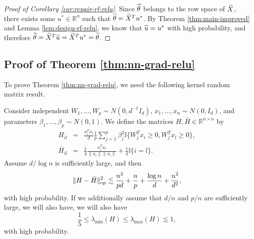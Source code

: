 \begin{proof}[Proof of Corollary \ref{cor:repair-rf-relu}]
Since $\widehat{\theta}$ belongs to the row space of $\widetilde{X}$, there exists some $u^*\in\mathbb{R}^n$ such that $\widehat{\theta}=\widetilde{X}^Tu^*$.
By Theorem \ref{thm:main-improved} and Lemma \ref{lem:design-rf-relu}, we know that $\widetilde{u}=u^*$ with high probability, and therefore $\widetilde{\theta}=\widetilde{X}^T\widetilde{u}=\widetilde{X}^Tu^*=\widehat{\theta}$.
\end{proof}



\subsection{Proof of Theorem \ref{thm:nn-grad-relu}}

To prove Theorem \ref{thm:nn-grad-relu}, we need the following kernel random matrix result.
\begin{lemma}\label{lem:lim-H-relu}
Consider independent $W_1,\ldots,W_p\sim N(0,d^{-1}I_d)$, $x_1,\ldots,x_n\sim N(0,I_d)$, and parameters $\beta_1,\ldots,\beta_p\sim N(0,1)$. We define the matrices $H, \bar{H}\in\mathbb{R}^{n\times n}$ by
\begin{eqnarray*}
H_{il} &=& \frac{x_i^Tx_l}{d}\frac{1}{p}\sum_{j=1}^p\beta_j^2\mathbb{I}\{W_j^Tx_i\geq 0, W_j^Tx_l\geq 0\}, \\
\bar{H}_{il} &=& \frac{1}{4}\frac{x_i^Tx_l}{\|x_i\|\|x_l\|} + \frac{1}{4}\mathbb{I}\{i=l\}.
\end{eqnarray*}
Assume $d/\log n$ is sufficiently large, and then
$$\|H-\bar{H}\|_{\rm op}^2 \lesssim \frac{n^2}{pd} + \frac{n}{p} + \frac{\log n}{d} + \frac{n^2}{d^2},$$
with high probability. If we additionally assume that $d/n$ and $p/n$ are sufficiently large, we will also have, we will also have
$$\frac{1}{5}\leq\lambda_{\min}(H)\leq\lambda_{\max}(H)\lesssim 1,$$
with high probability.
\end{lemma}
